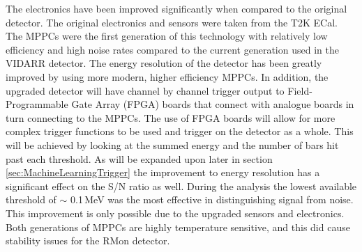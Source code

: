 The electronics have been improved significantly when compared to the original detector. The original electronics and sensors were taken from the T2K ECal. The MPPCs were the first generation of this technology with relatively low efficiency and high noise rates compared to the current generation used in the VIDARR detector. The energy resolution of the detector has been greatly improved by using more modern, higher efficiency MPPCs. In addition, the upgraded detector will have channel by channel trigger output to Field-Programmable Gate Array (FPGA) boards that connect with analogue boards in turn connecting to the MPPCs. The use of FPGA boards will allow for more complex trigger functions to be used and trigger on the detector as a whole. This will be achieved by looking at the summed energy and the number of bars hit past each threshold. As will be expanded upon later in section \ref{sec:MachineLearningTrigger} the improvement to energy resolution has a significant effect on the S/N ratio as well. During the analysis the lowest available threshold of $\sim$ 0.1\,MeV was the most effective in distinguishing signal from noise. This improvement is only possible due to the upgraded sensors and electronics. Both generations of MPPCs are highly temperature sensitive, and this did cause stability issues for the RMon detector. %
